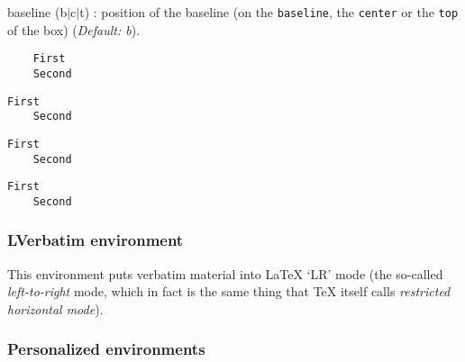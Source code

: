 \documentclass[twoside]{article}
\providecommand\optname[1]{\textsf{#1}}
\newenvironment{optlist}{\begin{description}%
  \renewcommand\makelabel[1]{%
    \descriptionlabel{\mdseries\optname{##1}}}%
  \itemsep0.25\itemsep}%
 {\end{description}}
\begin{document}
\begin{optlist}
  \item[baseline (b$\mid$c$\mid$t)]: position of the baseline (on the
  \texttt{baseline}, the \texttt{center} or the \texttt{top} of the box)
  (\emph{Default: b}).
\end{optlist}

\begin{SideBySideExample}
  \begin{BVerbatim}
    First
    Second
  \end{BVerbatim}
  \begin{BVerbatim}[baseline=c]
    First
    Second
  \end{BVerbatim}
\end{SideBySideExample}

\begin{SideBySideExample}
  \begin{BVerbatim}[boxwidth=2cm]
    First
    Second
  \end{BVerbatim}
  \begin{BVerbatim}[boxwidth=2cm,
                    baseline=t]
    First
    Second
  \end{BVerbatim}
\end{SideBySideExample}

\subsubsection{LVerbatim environment}

  This environment puts verbatim material into \LaTeX{} `LR' mode (the
so-called \emph{left-to-right} mode, which in fact is the same thing that
\TeX{} itself calls \emph{restricted horizontal mode}).

\subsubsection{Personalized environments}
\end{document}
